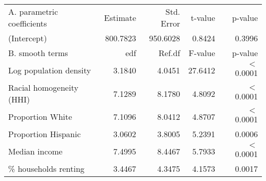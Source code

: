 \begin{table}[ht]
\centering
\begin{tabular}{lrrrr}
   \hline
A. parametric coefficients & Estimate & Std. Error & t-value & p-value \\ 
  (Intercept) & 800.7823 & 950.6028 & 0.8424 & 0.3996 \\ 
   \hline
B. smooth terms & edf & Ref.df & F-value & p-value \\ 
  Log population density & 3.1840 & 4.0451 & 27.6412 & $<$ 0.0001 \\ 
  Racial homogeneity (HHI) & 7.1289 & 8.1780 & 4.8092 & $<$ 0.0001 \\ 
  Proportion White & 7.1096 & 8.0412 & 4.8707 & $<$ 0.0001 \\ 
  Proportion Hispanic & 3.0602 & 3.8005 & 5.2391 & 0.0006 \\ 
  Median income & 7.4995 & 8.4467 & 5.7933 & $<$ 0.0001 \\ 
  \% households renting & 3.4467 & 4.3475 & 4.1573 & 0.0017 \\ 
   \hline
\end{tabular}
\caption{ } 
\label{Demographic GAM}
\end{table}
